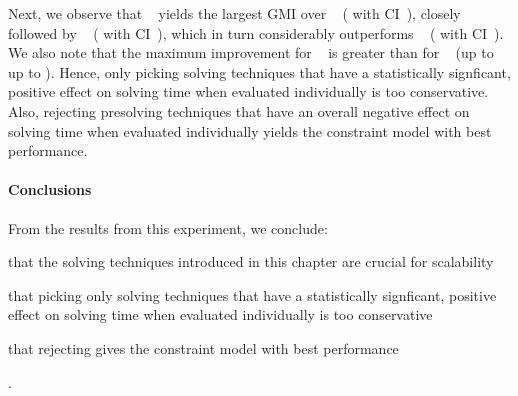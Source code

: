 Next, we observe that ~
yields the largest \gls{GMI} over ~ (\printGMI{%
  \SolvTechDisableAllBadPrePlusSolvingTimeSpeedupPrePlusSolvingTimeRegularSpeedupGmean%
} with \gls{CI}~\printGMICI{%
  \SolvTechDisableAllBadPrePlusSolvingTimeSpeedupPrePlusSolvingTimeRegularSpeedupCiMin%
}{%
  \SolvTechDisableAllBadPrePlusSolvingTimeSpeedupPrePlusSolvingTimeRegularSpeedupCiMax%
}), closely followed by ~
(\printGMI{%
  \SolvTechDisableAllPrePlusSolvingTimeSpeedupPrePlusSolvingTimeRegularSpeedupGmean%
} with \gls{CI}~\printGMICI{%
  \SolvTechDisableAllPrePlusSolvingTimeSpeedupPrePlusSolvingTimeRegularSpeedupCiMin%
}{%
  \SolvTechDisableAllPrePlusSolvingTimeSpeedupPrePlusSolvingTimeRegularSpeedupCiMax%
}),
which in turn considerably outperforms ~
(\printGMI{%
  \SolvTechEnableOnlyAllGoodPrePlusSolvingTimeSpeedupPrePlusSolvingTimeRegularSpeedupGmean%
} with \gls{CI}~\printGMICI{%
  \SolvTechEnableOnlyAllGoodPrePlusSolvingTimeSpeedupPrePlusSolvingTimeRegularSpeedupCiMin%
}{%
  \SolvTechEnableOnlyAllGoodPrePlusSolvingTimeSpeedupPrePlusSolvingTimeRegularSpeedupCiMax%
}).
%
We also note that the maximum improvement for ~ is greater than for ~ (up to \printZCNorm{%
  \SolvTechDisableAllBadPrePlusSolvingTimeSpeedupPrePlusSolvingTimeZeroCenteredSpeedupMax%
} \versus up to \printZCNorm{%
  \SolvTechDisableAllPrePlusSolvingTimeSpeedupPrePlusSolvingTimeZeroCenteredSpeedupMax
}).
%
Hence, only picking solving techniques that have a statistically signficant,
positive effect on solving time when evaluated individually is too conservative.
%
Also, rejecting \gls{presolving} techniques that have an overall negative effect
on solving time when evaluated individually yields the \gls{constraint model}
with best performance.


\paragraph{Conclusions}

From the results from this experiment, we conclude:
%
\begin{enumerate*}[label=(\roman*), itemjoin={;\ }, itemjoin*={; and\ }]
  \item that the solving techniques introduced in this chapter are crucial for
    scalability
  \item that picking only solving techniques that have a statistically
    signficant, positive effect on solving time when evaluated individually is
    too conservative
  \item that rejecting  gives the \gls{constraint model} with best
    performance
\end{enumerate*}.


